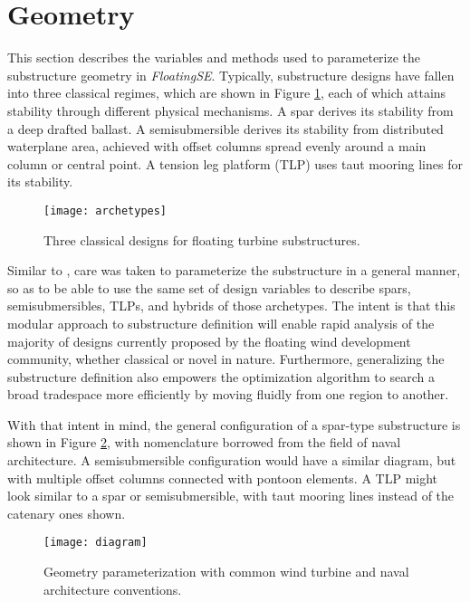 \section{Geometry}
\label{sec:geom}
This section describes the variables and methods used to parameterize
the substructure geometry in \textit{FloatingSE}.  Typically,
substructure designs have fallen into three classical regimes, which are
shown in Figure \ref{fig:archetype}, each of which attains stability
through different physical mechanisms.  A spar derives its stability from a
deep drafted ballast.  A semisubmersible derives its stability from
distributed waterplane area, achieved with offset columns spread evenly
around a main column or central point.  A tension leg platform (TLP) uses taut
mooring lines for its stability.

\begin{figure}[htbp]
  \begin{center}
    \texttt{[image: archetypes]}
    \caption{Three classical designs for floating turbine substructures.}
    \label{fig:archetype}
  \end{center}
\end{figure}

Similar to \citet{karimi2017}, care was taken to parameterize the
substructure in a general manner, so as to be able to use the same set
of design variables to describe spars, semisubmersibles, TLPs, and
hybrids of those archetypes.  The intent is that this modular approach
to substructure definition will enable rapid analysis of the majority of
designs currently proposed by the floating wind development community,
whether classical or novel in nature.  Furthermore, generalizing the
substructure definition also empowers the optimization algorithm to
search a broad tradespace more efficiently by moving fluidly from one
region to another.

With that intent in mind, the general configuration of a spar-type
substructure is shown in Figure \ref{fig:diagram}, with nomenclature
borrowed from the field of naval architecture.  A semisubmersible
configuration would have a similar diagram, but with multiple offset
columns connected with pontoon elements.  A TLP might look similar to a
spar or semisubmersible, with taut mooring lines instead of the catenary
ones shown.

\begin{figure}[htb]
  \begin{center}
    \texttt{[image: diagram]}
    \caption{Geometry parameterization with common wind turbine and
      naval architecture conventions.}
    \label{fig:diagram}
  \end{center}
\end{figure}

